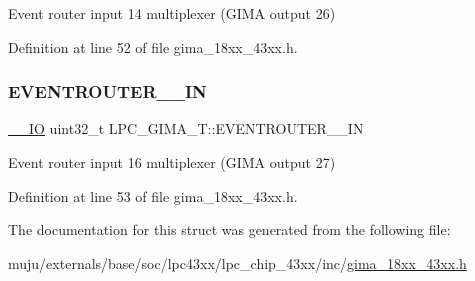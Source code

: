 Event router input 14 multiplexer (G\+I\+MA output 26) 

Definition at line 52 of file gima\+\_\+18xx\+\_\+43xx.\+h.

\mbox{\label{struct_l_p_c___g_i_m_a___t_ade191ef1ff718f439189b2cedbc39b69}} 
\subsubsection{\texorpdfstring{E\+V\+E\+N\+T\+R\+O\+U\+T\+E\+R\+\_\+\_\+\+IN}{EVENTROUTER\_16\_IN}}
{\footnotesize\ttfamily \hyperlink{core__sc300_8h_aec43007d9998a0a0e01faede4133d6be}{\+\_\+\+\_\+\+IO} uint32\+\_\+t L\+P\+C\+\_\+\+G\+I\+M\+A\+\_\+\+T\+::\+E\+V\+E\+N\+T\+R\+O\+U\+T\+E\+R\+\_\+\_\+\+IN}

Event router input 16 multiplexer (G\+I\+MA output 27) 

Definition at line 53 of file gima\+\_\+18xx\+\_\+43xx.\+h.



The documentation for this struct was generated from the following file\+:\begin{DoxyCompactItemize}
\item 
muju/externals/base/soc/lpc43xx/lpc\+\_\+chip\+\_\+43xx/inc/\hyperlink{gima__18xx__43xx_8h}{gima\+\_\+18xx\+\_\+43xx.\+h}\end{DoxyCompactItemize}
